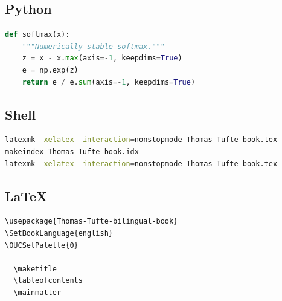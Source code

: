 \subsection{Python}
\begin{lstlisting}[language=Python]
def softmax(x):
    """Numerically stable softmax."""
    z = x - x.max(axis=-1, keepdims=True)
    e = np.exp(z)
    return e / e.sum(axis=-1, keepdims=True)
\end{lstlisting}

\subsection{Shell}
\begin{lstlisting}[language=bash]
latexmk -xelatex -interaction=nonstopmode Thomas-Tufte-book.tex
makeindex Thomas-Tufte-book.idx
latexmk -xelatex -interaction=nonstopmode Thomas-Tufte-book.tex
\end{lstlisting}

\subsection{LaTeX}
\begin{lstlisting}[language={[LaTeX]TeX}]
\usepackage{Thomas-Tufte-bilingual-book}
\SetBookLanguage{english}
\OUCSetPalette{0}

  \maketitle
  \tableofcontents
  \mainmatter

\end{lstlisting}

\cleardoublepage
